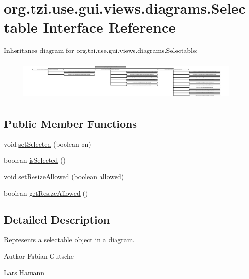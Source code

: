\hypertarget{interfaceorg_1_1tzi_1_1use_1_1gui_1_1views_1_1diagrams_1_1_selectable}{\section{org.\-tzi.\-use.\-gui.\-views.\-diagrams.\-Selectable Interface Reference}
\label{interfaceorg_1_1tzi_1_1use_1_1gui_1_1views_1_1diagrams_1_1_selectable}
}
Inheritance diagram for org.\-tzi.\-use.\-gui.\-views.\-diagrams.\-Selectable\-:\begin{figure}[H]
\begin{center}
\leavevmode
\includegraphics[height=2.066421cm]{interfaceorg_1_1tzi_1_1use_1_1gui_1_1views_1_1diagrams_1_1_selectable}
\end{center}
\end{figure}
\subsection*{Public Member Functions}
\begin{DoxyCompactItemize}
\item 
void \hyperlink{interfaceorg_1_1tzi_1_1use_1_1gui_1_1views_1_1diagrams_1_1_selectable_a56bc20567d9d7830bd43b6d000f30137}{set\-Selected} (boolean on)
\item 
boolean \hyperlink{interfaceorg_1_1tzi_1_1use_1_1gui_1_1views_1_1diagrams_1_1_selectable_a2fa4b952beb210990af1b4d4bee9de0c}{is\-Selected} ()
\item 
void \hyperlink{interfaceorg_1_1tzi_1_1use_1_1gui_1_1views_1_1diagrams_1_1_selectable_a59a8695efe444ccd6332b134edd3b0e2}{set\-Resize\-Allowed} (boolean allowed)
\item 
boolean \hyperlink{interfaceorg_1_1tzi_1_1use_1_1gui_1_1views_1_1diagrams_1_1_selectable_a95b58d972dac7a89ae7bd6f5edaded08}{get\-Resize\-Allowed} ()
\end{DoxyCompactItemize}


\subsection{Detailed Description}
Represents a selectable object in a diagram. \begin{DoxyAuthor}{Author}
Fabian Gutsche 

Lars Hamann 
\end{DoxyAuthor}


